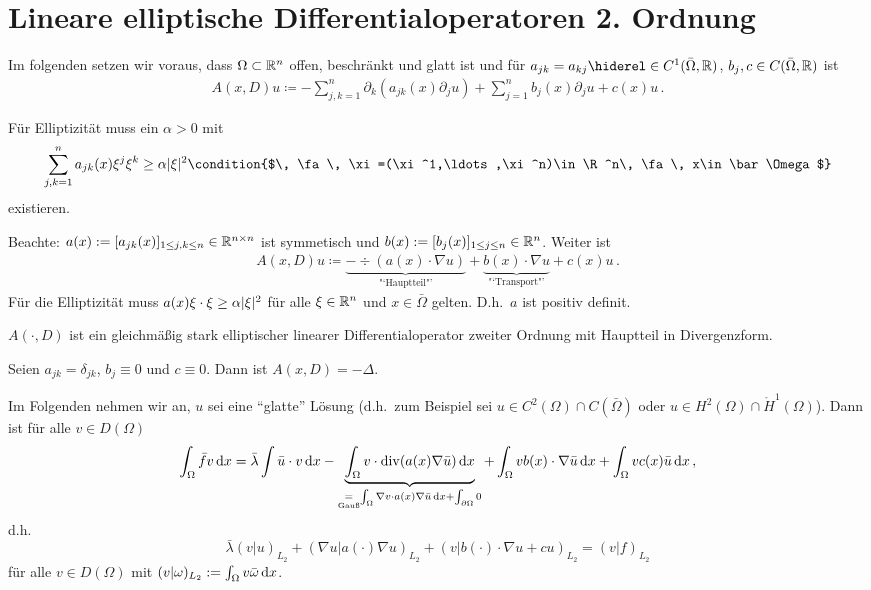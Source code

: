 \section{Lineare elliptische Differentialoperatoren 2. Ordnung}

Im folgenden setzen wir voraus, dass $\Omega\subset\mathbb{R}^n$ offen, beschränkt und glatt ist und für $a_{jk}=a_{kj}\hiderel\in C^1(\bar\Omega, \R)$, $b_j,c\in C(\bar\Omega,\mathbb{R})$ ist
\begin{align*}
  A(x,D)u\coloneqq -\sum_{j,k=1}^n\partial_k(a_{jk}(x)\partial_ju)
  + \sum_{j=1}^nb_j(x)\partial_ju+c(x)u\, .
\end{align*}

Für Elliptizität muss ein $\alpha>0$ mit
\begin{dmath*}
  \sum_{j,k=1}^na_{jk}(x)\xi^j\xi^k\geq\alpha\abs\xi^2
  \condition{$\, \fa\, \xi=(\xi^1,\ldots,\xi^n)\in\R^n\,  \fa\,  x\in\bar\Omega$}
\end{dmath*}
existieren.

Beachte: $a(x):=[a_{jk}(x)]_{1\leq j,k\leq n}\in\mathbb{R}^{n\times n}$ ist symmetisch und $b(x):=[b_j(x)]_{1\leq j\leq n}\in\mathbb{R}^n$. Weiter ist
\begin{align*}
  A(x,D)u\coloneqq\underbrace{-\div (a(x)\cdot\nabla u)}_{\text{"`Hauptteil"'}}
    +\underbrace{b(x)\cdot\nabla u}_{\text{"`Transport"'}}+c(x)u\, .
\end{align*}
Für die Elliptizität muss $a(x)\xi\cdot\xi\geq\alpha\lvert \xi\rvert^2$ für alle $\xi\in\mathbb{R}^n$ und $x\in\bar\Omega$ gelten. D.h.\ $a$ ist positiv definit.

$A(\cdot, D)$ ist ein gleichmäßig stark elliptischer linearer Differentialoperator zweiter Ordnung mit Hauptteil in Divergenzform.

Seien $a_{jk}=\delta_{jk}$, $b_j\equiv 0$ und $c\equiv 0$. Dann ist $A(x,D)=-\Delta$.

Im Folgenden nehmen wir an, $u$ sei eine "`glatte"' Lösung (d.h.\ zum Beispiel sei $u\in C^2(\Omega)\cap C(\bar\Omega)$ oder $u\in H^2(\Omega)\cap \mathring H^1(\Omega)$). Dann ist für alle $v\in D(\Omega)$
\begin{dmath*}
  \int_\Omega\bar fv\d x=\bar\lambda\int\bar u\cdot v\d x
  -\underbrace{\int_\Omega v\cdot\div(a(x)\nabla\bar u)\d x}_{ 
    \underset{\text{Gauß}}=\int_\Omega\nabla v\cdot a(x)\nabla \bar u\d x+\int_{\partial\Omega}0
  }
  +\int_\Omega vb(x)\cdot\nabla\bar u\d x+\int_\Omega vc(x)\bar u\d x\, ,
\end{dmath*}
d.h.\
\begin{dmath*}
  \bar\lambda(v\vert u)_{L_2}+(\nabla u\vert a(\cdot)\nabla u)_{L_2}
  +(v\vert b(\cdot)\cdot\nabla u+cu)_{L_2}
  = (v\vert f)_{L_2}
\end{dmath*}
für alle $v\in D(\Omega)$ mit $(v\vert\omega)_{L_2}:= \int_\Omega v\bar\omega\,\mathrm{d} x$.

